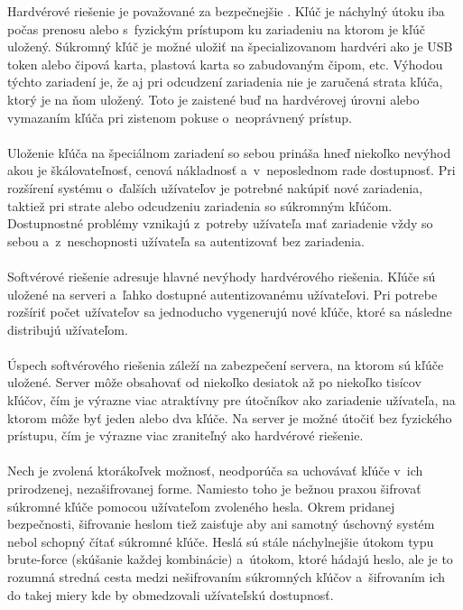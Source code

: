 \documentclass[
  printed, %
  table,   %
oneside,
  nolof,     %
  nolot,     %
]{fithesis3}
\begin{document}
Hardvérové riešenie je považované za bezpečnejšie \cite{privateKeyStorage}. Kľúč je náchylný útoku iba počas prenosu alebo s~fyzickým prístupom ku zariadeniu na ktorom je kľúč uložený. Súkromný kľúč je možné uložiť na špecializovanom hardvéri ako je USB token alebo  čipová karta, plastová karta so zabudovaným čipom, etc. Výhodou týchto zariadení je, že aj pri odcudzení zariadenia nie je zaručená strata kľúča, ktorý je na ňom uložený. Toto je zaistené buď na hardvérovej úrovni alebo vymazaním kľúča pri zistenom pokuse o~neoprávnený prístup.\paragraph{}
Uloženie kľúča na špeciálnom zariadení so sebou prináša hneď niekoľko nevýhod akou je škálovateľnosť, cenová nákladnosť a~v~neposlednom rade dostupnosť. Pri rozšírení systému o~ďalších užívateľov je potrebné nakúpiť nové zariadenia, taktiež pri strate alebo odcudzeniu zariadenia so súkromným kľúčom. Dostupnostné problémy vznikajú z~potreby užívateľa mať zariadenie vždy so sebou a~z~neschopnosti užívateľa sa autentizovať bez zariadenia. \paragraph{} 
Softvérové riešenie adresuje hlavné nevýhody hardvérového riešenia. Kľúče sú uložené na serveri a~ľahko dostupné autentizovanému užívateľovi. Pri potrebe rozšíriť počet užívateľov sa jednoducho vygenerujú nové kľúče, ktoré sa následne distribujú užívateľom.  \paragraph{}
Úspech softvérového riešenia záleží na zabezpečení servera, na ktorom sú kľúče uložené. Server môže obsahovať od niekoľko desiatok až po niekoľko tisícov kľúčov, čím je výrazne viac atraktívny pre útočníkov ako zariadenie užívateľa, na ktorom môže byť jeden alebo dva kľúče. Na server je možné útočiť bez fyzického prístupu, čím je výrazne viac zraniteľný ako hardvérové riešenie. \paragraph{}

Nech je zvolená ktorákoľvek možnosť, neodporúča sa  uchovávať kľúče v~ich prirodzenej, nezašifrovanej forme. Namiesto toho je bežnou praxou šifrovať súkromné kľúče pomocou užívateľom zvoleného hesla. Okrem pridanej bezpečnosti, šifrovanie heslom tiež zaisťuje aby ani samotný úschovný systém nebol schopný čítať súkromné kľúče. Heslá sú stále náchylnejšie útokom typu brute-force (skúšanie každej kombinácie) a~útokom, ktoré hádajú heslo, ale je to rozumná stredná cesta medzi nešifrovaním súkromných kľúčov a~šifrovaním ich do takej miery kde by obmedzovali užívateľskú dostupnosť. \paragraph{}   
 
\end{document}
